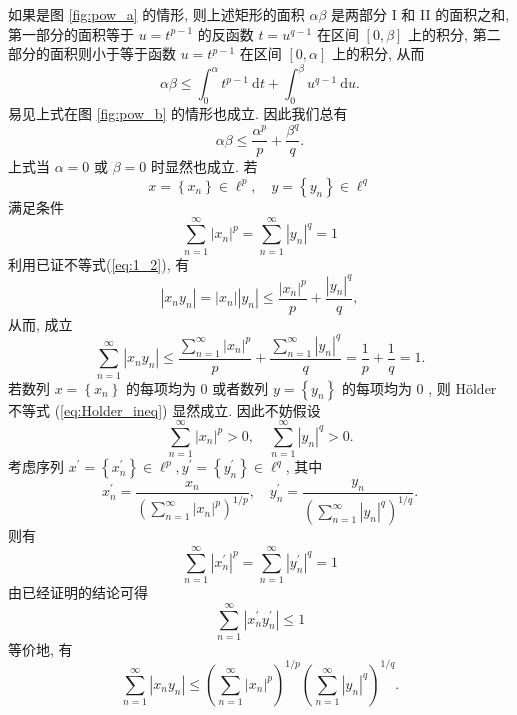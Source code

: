 \documentclass[openany]{ctexbook}
\makeatletter
\theoremstyle{kaiti}
\theoremstyle{normal}
\renewenvironment{proof}[1][\proofname]{\par
    \pushQED{\qed}%
    \normalfont \topsep6\p@\@plus6\p@\relax
    \trivlist
    \item\relax
    {\heiti #1}\hspace{2\labelsep}\ignorespaces
  }{%
    \popQED\endtrivlist\@endpefalse
  }
\makeatother
\begin{document}
\begin{proof}
如果是图 \ref{fig:pow_a} 的情形, 则上述矩形的面积 $\alpha \beta$ 是两部分 I 和 II 的面积之和, 第一部分的面积等于 $u=t^{p-1}$ 的反函数 $t=u^{q-1}$ 在区间 $[0, \beta]$ 上的积分, 第二部分的面积则小于等于函数 $u=t^{p-1}$ 在区间 $[0, \alpha]$ 上的积分, 从而
\begin{equation}
  \label{eq:1_2}
  \alpha \beta \leqslant \int_0^{\alpha} t^{p-1} \mathrm{~d} t+\int_0^{\beta} u^{q-1} \mathrm{~d} u.
\end{equation}
易见上式在图 \ref{fig:pow_b} 的情形也成立. 因此我们总有
$$
\alpha \beta \leqslant \frac{\alpha^{p}}{p}+\frac{\beta^{q}}{q}.
$$
上式当 $\alpha=0$ 或 $\beta=0$ 时显然也成立. 若
$$
x=\left\{x_n\right\} \in \ell^{p}, \quad y=\left\{y_n\right\} \in \ell^{q}
$$
满足条件
$$
\sum_{n=1}^{\infty}\left|x_n\right|^{p}=\sum_{n=1}^{\infty}\left|y_n\right|^{q}=1
$$
利用已证不等式(\ref{eq:1_2}), 有
$$
\left|x_n y_n\right|=\left|x_n\right|\left|y_n\right| \leqslant \frac{\left|x_n\right|^{p}}{p}+\frac{\left|y_n\right|^{q}}{q},
$$
从而, 成立
$$
\sum_{n=1}^{\infty}\left|x_n y_n\right| \leqslant \frac{\sum_{n=1}^{\infty}\left|x_n\right|^{p}}{p}+\frac{\sum_{n=1}^{\infty}\left|y_n\right|^{q}}{q}=\frac{1}{p}+\frac{1}{q}=1.
$$
若数列 $x=\left\{x_n\right\}$ 的每项均为 0 或者数列 $y=\left\{y_n\right\}$ 的每项均为 0 , 则 Hölder 不等式 (\ref{eq:Holder_ineq}) 显然成立. 因此不妨假设
$$
\sum_{n=1}^{\infty}\left|x_n\right|^{p}>0, \quad \sum_{n=1}^{\infty}\left|y_n\right|^{q}>0.
$$
考虑序列 $x^{\prime}=\left\{x_n^{\prime}\right\} \in \ell^{p}, y^{\prime}=\left\{y_n^{\prime}\right\} \in \ell^{q}$, 其中
$$
x_n^{\prime}=\frac{x_n}{\left(\sum_{n=1}^{\infty}\left|x_n\right|^{p}\right)^{1 / p}}, \quad y_n^{\prime}=\frac{y_n}{\left(\sum_{n=1}^{\infty}\left|y_n\right|^{q}\right)^{1 / q}}.
$$
则有
$$
\sum_{n=1}^{\infty}\left|x_n^{\prime}\right|^{p}=\sum_{n=1}^{\infty}\left|y_n^{\prime}\right|^{q}=1
$$
由已经证明的结论可得
$$
\sum_{n=1}^{\infty}\left|x_n^{\prime} y_n^{\prime}\right| \leqslant 1
$$
等价地, 有
$$
\sum_{n=1}^{\infty}\left|x_n y_n\right| \leqslant\left(\sum_{n=1}^{\infty}\left|x_n\right|^{p}\right)^{1 / p}\left(\sum_{n=1}^{\infty}\left|y_n\right|^{q}\right)^{1 / q}.
$$
\end{proof}
\end{document}

